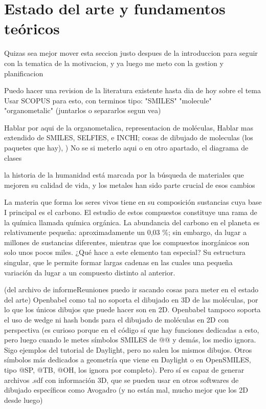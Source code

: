 \chapter{Estado del arte y fundamentos teóricos}

Quizas sea mejor mover esta seccion justo despues de la introduccion para seguir con la tematica de la motivacion, y ya luego me meto con la gestion y planificacion

Puedo hacer una revision de la literatura existente hasta dia de hoy sobre el tema
Usar SCOPUS para esto, con terminos tipo: "SMILES" "molecule" "organometalic" (juntarlos o separarlos segun vea)

Hablar por aqui de la organometalica, representacion de moléculas, Hablar mas extendido de SMILES, SELFIES, e INCHI; cosas de dibujado de moleculas (los paquetes que hay), )
No se si meterlo aqui o en otro apartado, el diagrama de clases

la historia de la humanidad está marcada por la búsqueda de materiales que mejoren su calidad de vida, y los metales han sido parte crucial de esos cambios 

La materia que forma los seres vivos tiene en su composición sustancias cuya base I principal es el carbono. El estudio de estos compuestos constituye una rama de la química llamada química orgánica. La abundancia del carbono en el planeta es relativamente pequeña: aproximadamente un 0,03 \%; sin embargo, da lugar a millones de sustancias diferentes, mientras que los compuestos inorgánicos son solo unos pocos miles. ¿Qué hace a este elemento tan especial? Su estructura singular, que le permite formar largas cadenas en las cuales una pequeña variación da lugar a un compuesto distinto al anterior.


(del archivo de informeReuniones puedo ir sacando cosas para meter en el estado del arte) Openbabel como tal no soporta el dibujado en 3D de las moléculas, por lo que los únicos dibujos que puede hacer son en 2D. Openbabel tampoco soporta el uso de wedge ni hash bonds para el dibujado de moléculas en 2D con perspectiva (es curioso porque en el código sí que hay funciones dedicadas a esto, pero luego cuando le metes símbolos SMILES de @@ y demás, los medio ignora. Sigo ejemplos del tutorial de Daylight, pero no salen los mismos dibujos. Otros símbolos más dedicados a geometría que viene en Daylight o en OpenSMILES, tipo @SP, @TB, @OH, los ignora por completo). Pero sí es capaz de generar archivos .sdf con información 3D, que se pueden usar en otros softwares de dibujado específicos como Avogadro (y no están mal, mucho mejor que los 2D desde luego)

\bigskip
